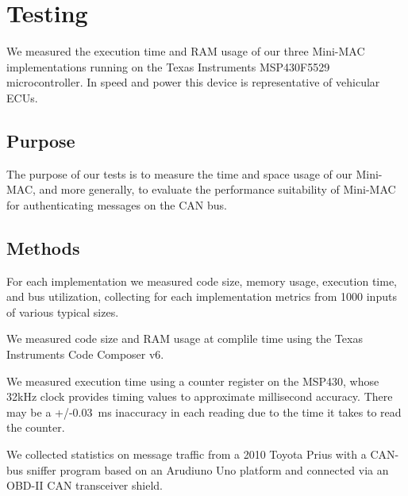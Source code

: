 \section{Testing}
\label{testing}

We measured the execution time and RAM usage of our three Mini-MAC implementations 
running on the Texas Instruments MSP430F5529 microcontroller. 
In speed and power this device is representative of vehicular ECUs.

\subsection{Purpose}
\label{purpose}

The purpose of our tests is to measure the time and space usage of our Mini-MAC, and more generally,
to evaluate the performance suitability of Mini-MAC for authenticating messages on the CAN bus.

\subsection{Methods}
\label{methods}

For each implementation we measured code size, memory usage, execution time, and bus utilization,
collecting for each implementation metrics from 1000 inputs of various typical sizes.  


We measured code size and RAM usage at complile time using 
the Texas Instruments Code Composer v6.


We measured execution time using a counter register on the MSP430, 
whose 32kHz clock provides timing values to approximate millisecond accuracy. 
There may be a +/-0.03~ms inaccuracy in each reading due to the
time it takes to read the counter.


We collected statistics on message traffic from a 2010 Toyota Prius with a CAN-bus sniffer program 
based on an Arudiuno Uno platform and connected via an OBD-II CAN transceiver shield.

